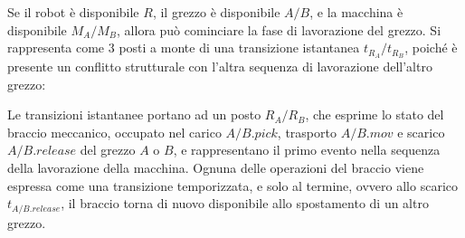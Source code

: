 \documentclass{article}
\numberwithin{equation}{subsection}
\begin{document}
Se il robot è disponibile $R$, il grezzo è disponibile $A/B$, e la macchina è disponibile $M_A/M_B$, allora può cominciare la fase di lavorazione del grezzo. Si rappresenta 
come $3$ posti a monte di una transizione istantanea $t_{R_A}/t_{R_B}$, poiché è presente un conflitto strutturale con l'altra sequenza di lavorazione dell'altro grezzo:
\begin{center}
\end{center}
Le transizioni istantanee portano ad un posto $R_A/R_B$, che esprime lo stato del braccio meccanico, occupato nel carico $A/B.pick$, trasporto $A/B.mov$ e scarico $A/B.release$ 
del grezzo $A$ o $B$, e rappresentano il primo evento nella sequenza della lavorazione della macchina. Ognuna delle operazioni del braccio viene espressa come una transizione 
temporizzata, e solo al termine, ovvero allo scarico $t_{A/B.release}$, il braccio torna di nuovo disponibile allo spostamento di un altro grezzo. 
\end{document}
